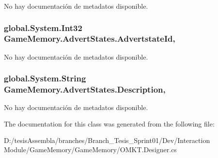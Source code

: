 No hay documentación de metadatos disponible. 

\hypertarget{class_game_memory_1_1_advert_states_a4fc6f03f0b82dcc6f7bec119f78ac16c}{
\subsubsection[{Advertstate\-Id}]{\setlength{\rightskip}{0pt plus 5cm}global.\-System.\-Int32 Game\-Memory.\-Advert\-States.\-Advertstate\-Id\hspace{0.3cm}{\ttfamily [get]}, {\ttfamily [set]}}}\label{class_game_memory_1_1_advert_states_a4fc6f03f0b82dcc6f7bec119f78ac16c}


No hay documentación de metadatos disponible. 

\hypertarget{class_game_memory_1_1_advert_states_af1d9170e4f56ed8db771b2f28bfa3307}{
\subsubsection[{Description}]{\setlength{\rightskip}{0pt plus 5cm}global.\-System.\-String Game\-Memory.\-Advert\-States.\-Description\hspace{0.3cm}{\ttfamily [get]}, {\ttfamily [set]}}}\label{class_game_memory_1_1_advert_states_af1d9170e4f56ed8db771b2f28bfa3307}


No hay documentación de metadatos disponible. 



The documentation for this class was generated from the following file\-:\begin{DoxyCompactItemize}
\item 
D\-:/tesis\-Assembla/branches/\-Branch\-\_\-\-Tesis\-\_\-\-Sprint01/\-Dev/\-Interaction Module/\-Game\-Memory/\-Game\-Memory/O\-M\-K\-T.\-Designer.\-cs\end{DoxyCompactItemize}
